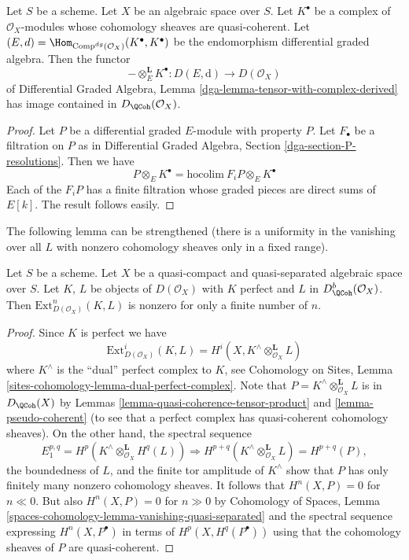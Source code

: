 \begin{lemma}
\label{lemma-tensor-with-QCoh-complex}
Let $S$ be a scheme. Let $X$ be an algebraic space over $S$. Let $K^\bullet$
be a complex of $\mathcal{O}_X$-modules whose cohomology sheaves are
quasi-coherent. Let
$(E, d) = \Hom_{\text{Comp}^{dg}(\mathcal{O}_X)}(K^\bullet, K^\bullet)$
be the endomorphism differential graded algebra. Then the functor
$$
- \otimes_E^\mathbf{L} K^\bullet :
D(E, \text{d}) \longrightarrow D(\mathcal{O}_X)
$$
of
Differential Graded Algebra, Lemma
\ref{dga-lemma-tensor-with-complex-derived}
has image contained in $D_\QCoh(\mathcal{O}_X)$.
\end{lemma}

\begin{proof}
Let $P$ be a differential graded $E$-module with property $P$.
Let $F_\bullet$ be a filtration on $P$ as in
Differential Graded Algebra, Section \ref{dga-section-P-resolutions}.
Then we have
$$
P \otimes_E K^\bullet = \text{hocolim}\ F_iP \otimes_E K^\bullet
$$
Each of the $F_iP$ has a finite filtration whose graded pieces
are direct sums of $E[k]$. The result follows easily.
\end{proof}

\noindent
The following lemma can be strengthened (there is a uniformity
in the vanishing over all $L$ with nonzero cohomology sheaves
only in a fixed range).

\begin{lemma}
\label{lemma-ext-from-perfect-into-bounded-QCoh}
Let $S$ be a scheme.
Let $X$ be a quasi-compact and quasi-separated algebraic space over $S$.
Let $K$, $L$ be objects of $D(\mathcal{O}_X)$ with
$K$ perfect and $L$ in $D^b_\QCoh(\mathcal{O}_X)$.
Then $\text{Ext}^n_{D(\mathcal{O}_X)}(K, L)$ is nonzero
for only a finite number of $n$.
\end{lemma}

\begin{proof}
Since $K$ is perfect we have
$$
\text{Ext}^i_{D(\mathcal{O}_X)}(K, L) =
H^i(X, K^\wedge \otimes_{\mathcal{O}_X}^\mathbf{L} L)
$$
where $K^\wedge$ is the ``dual'' perfect complex to $K$, see
Cohomology on Sites, Lemma \ref{sites-cohomology-lemma-dual-perfect-complex}.
Note that $P = K^\wedge \otimes_{\mathcal{O}_X}^\mathbf{L} L$
is in $D_\QCoh(X)$ by
Lemmas \ref{lemma-quasi-coherence-tensor-product} and
\ref{lemma-pseudo-coherent} (to see that a perfect complex
has quasi-coherent cohomology sheaves). On the other hand,
the spectral sequence
$$
E_1^{p, q} = H^p(K^\wedge \otimes_{\mathcal{O}_X}^\mathbf{L} H^q(L))
\Rightarrow
H^{p + q}(K^\wedge \otimes_{\mathcal{O}_X}^\mathbf{L} L) = H^{p + q}(P),
$$
the boundedness of $L$, and the finite tor amplitude of $K^\wedge$
show that $P$ has only finitely many nonzero cohomology sheaves.
It follows that $H^n(X, P) = 0$ for $n \ll 0$.
But also $H^n(X, P) = 0$ for $n \gg 0$ by
Cohomology of Spaces, Lemma
\ref{spaces-cohomology-lemma-vanishing-quasi-separated}
and the spectral sequence expressing $H^n(X, P^\bullet)$
in terms of $H^p(X, H^q(P^\bullet))$ using that the cohomology
sheaves of $P$ are quasi-coherent.
\end{proof}

